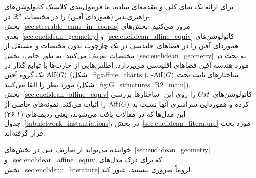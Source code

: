 برای ارائه یک نمای کلی و مقدمه‌ای ساده، ما فرمول‌بندی کلاسیک کانولوشن‌های -راهبری‌پذیر (هموردای آفین) را در مختصات $\mathbb{R}^d$ در بخش~\ref{sec:steerable_cnns_in_coords} مرور می‌کنیم.
بخش‌های بعدی~\ref{sec:euclidean_geometry} و~\ref{sec:euclidean_affine_equiv} کانولوشن‌های هموردای آفین را در فضاهای اقلیدسی در یک چارچوب بدون مختصات و مستقل از مختصات تعریف می‌کنند.
به طور خاص، بخش~\ref{sec:euclidean_geometry} به بحث در مورد هندسه آفین فضاهای اقلیدسی می‌پردازد.
اطلس‌هایی از چارت‌ها با توابع گذار در یک گروه آفین $\operatorname{Aff}(G)$ (شکل~\ref{fig:affine_charts})، -ساختارهای ثابت تحت $\operatorname{Aff}(G)$ مورد نظر را القا می‌کنند (شکل~\ref{fig:G_structures_R2_main}).
بخش~\ref{sec:euclidean_affine_equiv} کانولوشن‌های $G\mkern-1.4muM$ را روی این -ساختارها بررسی کرده و هموردایی سراسری آنها نسبت به $\operatorname{Aff}(G)$ را اثبات می‌کند.
نمونه‌های خاصی از این مدل‌ها که در مقالات یافت می‌شوند، یعنی ردیف‌های (۱-۲۶) جدول~\ref{tab:network_instantiations}، در بخش~\ref{sec:euclidean_literature} مورد بحث قرار گرفته‌اند.

خواننده می‌تواند از تعاریف فنی در بخش‌های~\ref{sec:euclidean_geometry} و~\ref{sec:euclidean_affine_equiv} که برای درک مدل‌های بخش~\ref{sec:euclidean_literature} لزوماً ضروری نیستند، عبور کند.